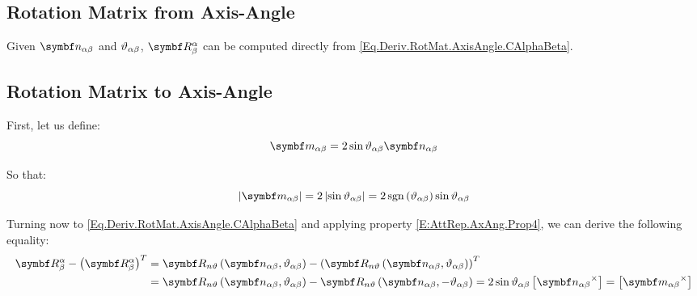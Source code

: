 \subsection{Rotation Matrix from Axis-Angle}
Given $\vrel{\rotax}{\alpha}{\beta}$ and $\vartheta_{\alpha \beta}$, $\RotM{\alpha}{\beta}$ can be computed directly from \eqref{Eq.Deriv.RotMat.AxisAngle.CAlphaBeta}.

\subsection{Rotation Matrix to Axis-Angle}
First, let us define:
\begin{equation}
	\vrel{m}{\alpha}{\beta} = 2 \sin \rel{\rotang}{\alpha}{\beta} \vrel{\rotax}{\alpha}{\beta} \label{E:AttRep:Conv:RotM2AA:Der1}
\end{equation}

So that:
\begin{equation} \label{E:AttRep:Conv:RotM2AA:Der2}
	\norm{\vrel{m}{\alpha}{\beta}} = 2 \abs{\sin \rel{\rotang}{\alpha}{\beta}} = 2 \sign{\rel{\rotang}{\alpha}{\beta}} \sin \rel{\rotang}{\alpha}{\beta}	
\end{equation}

Turning now to \eqref{Eq.Deriv.RotMat.AxisAngle.CAlphaBeta} and applying property \eqref{E:AttRep.AxAng.Prop4}, we can derive the following equality:
\begin{equation*}
\begin{split}
	\RotM{\alpha}{\beta} - \trp{\RotM{\alpha}{\beta}}
	&= \RotMAxAng{\vrel{\rotax}{\alpha}{\beta}}{\rel{\rotang}{\alpha}{\beta}} - \trp{\RotMAxAng{\vrel{\rotax}{\alpha}{\beta}}{\rel{\rotang}{\alpha}{\beta}}}
	\\
	&= \RotMAxAng{\vrel{\rotax}{\alpha}{\beta}}{\rel{\rotang}{\alpha}{\beta}} - \RotMAxAng{\vrel{\rotax}{\alpha}{\beta}}{-\rel{\rotang}{\alpha}{\beta}} = 2 \sin \rel{\rotang}{\alpha}{\beta} \vskew{\vrel{\rotax}{\alpha}{\beta}} = \vskew{\vrel{m}{\alpha}{\beta}}
\end{split}
\end{equation*}

